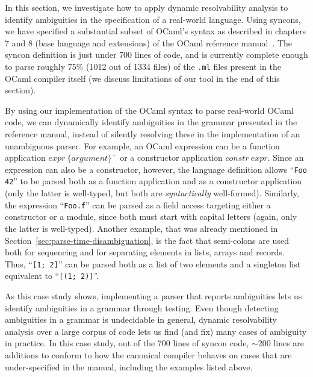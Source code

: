 \documentclass[acmsmall,review,anonymous]{acmart}\settopmatter{printfolios=true,printccs=false,printacmref=false}
\newcommand{\ocaml}{\lstinline[language={[objective]caml}]}
\begin{document}
In this section, we investigate how to apply dynamic resolvability
analysis to identify ambiguities in the specification of a
real-world language.
%
Using syncons, we have specified a substantial subset of OCaml's
syntax as described in chapters 7 and 8 (base language and
extensions) of the OCaml reference manual~\cite{OCamlReference}.
The syncon definition is just under 700 lines of code, and is
currently complete enough to parse roughly 75\% (1012 out of 1334
files) of the \verb|.ml| files present in the OCaml compiler
itself (we discuss limitations of our tool in the end of this
section).

By using our implementation of the OCaml syntax to parse
real-world OCaml code, we can dynamically identify ambiguities in
the grammar presented in the reference manual, instead of silently
resolving these in the implementation of an unambiguous parser.
%
For example, an OCaml expression can be a function application
$\mathit{expr}~\{\mathit{argument}\}^{+}$ or a constructor
application $\mathit{constr}~\mathit{expr}$. Since an expression
can also be a constructor, however, the language definition allows
``\ocaml{Foo 42}'' to be parsed both as a function application and
as a constructor application (only the latter is well-typed, but
both are \emph{syntactically} well-formed).
%
Similarly, the expression ``\ocaml{Foo.f}'' can be parsed as a
field access targeting either a constructor or a module, since
both must start with capital letters (again, only the latter is
well-typed).
%
Another example, that was already mentioned in
Section~\ref{sec:parse-time-disambiguation}, is the fact that
semi-colons are used both for sequencing and for separating
elements in lists, arrays and records. Thus, ``\ocaml{[1; 2]}''
can be parsed both as a list of two elements and a singleton list
equivalent to ``\ocaml{[(1; 2)]}''.

As this case study shows, implementing a parser that reports
ambiguities lets us identify ambiguities in a grammar through
testing. Even though detecting ambiguities in a grammar is
undecidable in general, dynamic resolvability analysis over a
large corpus of code lets us find (and fix) many cases of
ambiguity in practice.
%
In this case study, out of the 700 lines of syncon code, $\sim$200
lines are additions to conform to how the canonical compiler
behaves on cases that are under-specified in the
manual, including the examples listed above.

\end{document}
